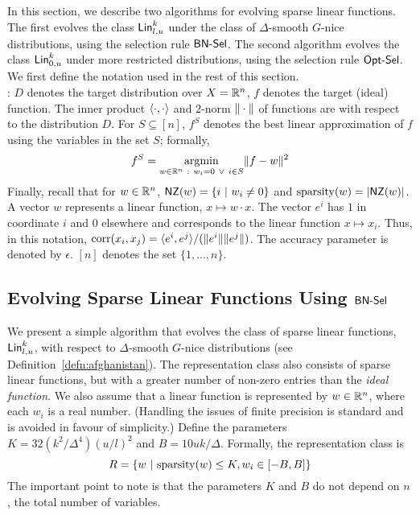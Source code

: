 In this section, we describe two algorithms for evolving sparse linear
functions. The first evolves the class $\mathsf{Lin}^k_{l, u}$ under the class of
$\Delta$-smooth $G$-nice distributions, using the selection rule $\mathsf{BN\mbox{-}Sel}$. The
second algorithm evolves the class $\mathsf{Lin}^k_{0, u}$ under more restricted
distributions, using the selection rule $\mathsf{Opt\mbox{-}Sel}$. We first define the notation
used in the rest of this section.\smallskip \\

: $D$ denotes the target distribution over $X =
\mathbb{R}^n$, $f$ denotes the target (ideal) function. The inner product
$\langle \cdot, \cdot \rangle$ and $2$-norm $\Vert \cdot \Vert$ of functions are with
respect to the distribution $D$. For $S \subseteq [n]$, $f^S$ denotes the best
linear approximation of $f$ using the variables in the set $S$; formally,
\begin{align}
f^S = \underset{w \in \mathbb{R}^n~:~ w_i = 0 ~\vee~i \in S}{\mathrm{argmin}} \Vert f -
w \Vert^2 \label{eqn:artichoke}
\end{align}
Finally, recall that for $w \in \mathbb{R}^n$, $\mathsf{NZ}(w) = \{i ~|~ w_i \neq 0 \}$ and
$\mathrm{sparsity}(w) = |\mathsf{NZ}(w)|$. A vector $w$ represents a linear function, $x \mapsto
w \cdot x$. The vector $e^i$ has $1$ in coordinate $i$ and $0$ elsewhere and
corresponds to the linear function $x \mapsto x_i$. Thus, in this notation,
$\mathrm{corr}(x_i, x_j) = \langle e^i, e^j \rangle/(\Vert e^i \Vert\Vert e^j \Vert)$. The accuracy
parameter is denoted by $\epsilon$. $[n]$ denotes the set $\{1, \ldots, n\}$.

\subsection{Evolving Sparse Linear Functions Using $\mathsf{BN\mbox{-}Sel}$}
\label{sec:sparse_linear}

We present a simple algorithm that evolves the class of sparse linear functions,
$\mathsf{Lin}^k_{l, u}$, with respect to $\Delta$-smooth $G$-nice distributions (see
Definition~\ref{defn:afghanistan}). The representation class also consists of sparse
linear functions, but with a greater number of non-zero entries than the
\emph{ideal function}.  We also assume that a linear function is represented by
$w \in \mathbb{R}^n$, where each $w_i$ is a real number. (Handling the issues of
finite precision is standard and is avoided in favour of simplicity.) Define the
parameters $K = 32(k^2/\Delta^4)(u/l)^2$ and $B = 10 uk /\Delta$. Formally, the
representation class is
\[ 
R = \{ w ~|~ \mathrm{sparsity}(w) \leq K, w_i \in [-B, B] \}
\]
The important point to note is that the parameters $K$ and $B$ do not depend on
$n$, the total number of variables.

